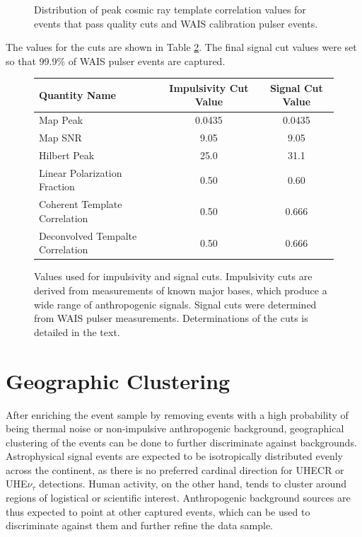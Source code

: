 \begin{figure}
	\centering
	\caption{Distribution of peak cosmic ray template correlation values for events that pass quality cuts and WAIS calibration pulser events.} 
	\label{fig:tempDeconvCut}
\end{figure}
	
	
The values for the cuts are shown in Table \ref{tab:cutValues}.  The final signal cut values were set so that 99.9\% of WAIS pulser events are captured.

\begin{figure}
\begin{tabular}[c]{|l|c|c|}
\hline
Quantity Name & Impulsivity Cut Value & Signal Cut Value \\
\hline
Map Peak & 0.0435 & 0.0435 \\
Map SNR & 9.05 & 9.05 \\
Hilbert Peak & 25.0 & 31.1 \\
Linear Polarization Fraction & 0.50 & 0.60 \\
Coherent Template Correlation & 0.50 & 0.666 \\
Deconvolved Tempalte Correlation & 0.50 & 0.666 \\
\hline
\end{tabular}
\caption{Values used for impulsivity and signal cuts.  Impulsivity cuts are derived from measurements of known major bases, which produce a wide range of anthropogenic signals.  Signal cuts were determined from WAIS pulser measurements.  Determinations of the cuts is detailed in the text.}
\label{tab:cutValues}
\end{figure}



\section{Geographic Clustering}%
	After enriching the event sample by removing events with a high probability of being thermal noise or non-impulsive anthropogenic background, geographical clustering of the events can be done to further discriminate against backgrounds. Astrophysical signal events are expected to be isotropically distributed evenly across the continent, as there is no preferred cardinal direction for UHECR or UHE$\nu_{\tau}$ detections.  Human activity, on the other hand, tends to cluster around regions of logistical or scientific interest.  Anthropogenic background sources are thus expected to point at other captured events, which can be used to discriminate against them and further refine the data sample.

